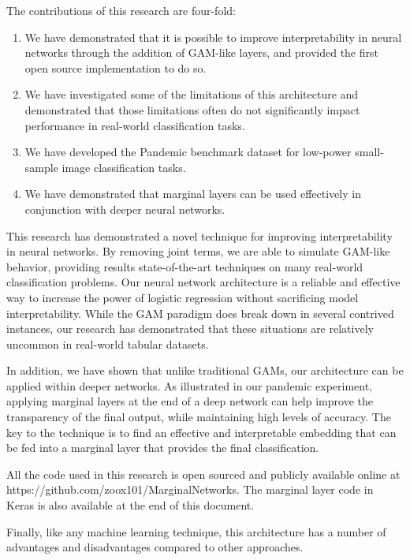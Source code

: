 
The contributions of this research are four-fold:

\begin{enumerate}
\item We have demonstrated that it is possible to improve interpretability in neural networks through the addition of GAM-like layers, and provided the first open source implementation to do so. 
\item We have investigated some of the limitations of this architecture and demonstrated that those limitations often do not significantly impact performance in real-world classification tasks.
\item We have developed the Pandemic benchmark dataset for low-power small-sample image classification tasks.
\item We have demonstrated that marginal layers can be used effectively in conjunction with deeper neural networks. 
\end{enumerate}

This research has demonstrated a novel technique for improving interpretability in neural networks. By removing joint terms, we are able to simulate GAM-like behavior, providing results  state-of-the-art techniques on many real-world classification problems. Our neural network architecture is a reliable and effective way to increase the power of logistic regression without sacrificing model interpretability. While the GAM paradigm does break down in several contrived instances, our research has demonstrated that these situations are relatively uncommon in real-world tabular datasets. 

In addition, we have shown that unlike traditional GAMs, our architecture can be applied within deeper networks. As illustrated in our pandemic experiment, applying marginal layers at the end of a deep network can help improve the transparency of the final output, while maintaining high levels of accuracy. The key to the technique is to find an effective and interpretable embedding that can be fed into a marginal layer that provides the final classification. 

All the code used in this research is open sourced and publicly available online at https://github.com/zoox101/MarginalNetworks. The marginal layer code in Keras is also available at the end of this document. 

Finally, like any machine learning technique, this architecture has a number of advantages and disadvantages compared to other approaches. 

